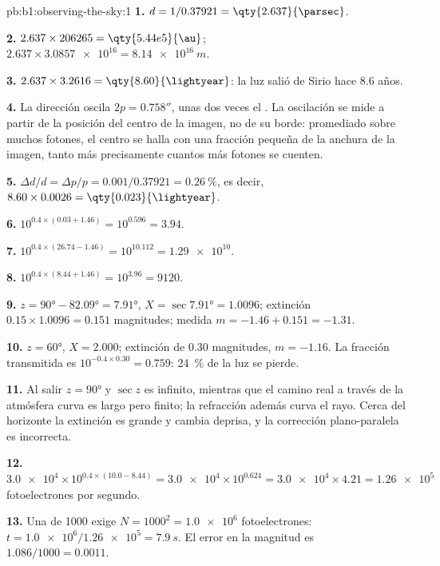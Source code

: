 \begin{solution}{pb:b1:observing-the-sky:1}
\textbf{1.} $d = 1/0.37921 = \qty{2.637}{\parsec}$.

\textbf{2.} $2.637\times206265 = \qty{5.44e5}{\au}$;
$2.637\times\num{3.0857e16} = \qty{8.14e16}{m}$.

\textbf{3.} $2.637\times3.2616 = \qty{8.60}{\lightyear}$: la luz salió de Sirio hace 8.6 años.

\textbf{4.} La dirección oscila $2p = \ang{;;0.758}$, unas dos veces el . La oscilación
se mide a partir de la posición del centro de la imagen, no de su borde: promediado sobre
muchos fotones, el centro se halla con una fracción pequeña de la anchura de la imagen, tanto
más precisamente cuantos más fotones se cuenten.

\textbf{5.} $\Delta d/d = \Delta p/p = 0.001/0.37921 = \qty{0.26}{\percent}$,
es decir, $8.60\times0.0026 = \qty{0.023}{\lightyear}$.

\textbf{6.} $10^{0.4\times(0.03 + 1.46)} = 10^{0.596} = 3.94$.

\textbf{7.} $10^{0.4\times(26.74 - 1.46)} = 10^{10.112} = \num{1.29e10}$.

\textbf{8.} $10^{0.4\times(8.44 + 1.46)} = 10^{3.96} = \num{9120}$.

\textbf{9.} $z = \ang{90} - \ang{82.09} = \ang{7.91}$, $X = \sec\ang{7.91} =
1.0096$; extinción $0.15\times1.0096 = 0.151$ magnitudes; medida
$m = -1.46 + 0.151 = -1.31$.

\textbf{10.} $z = \ang{60}$, $X = 2.000$; extinción de 0.30 magnitudes,
$m = -1.16$. La fracción transmitida es $10^{-0.4\times0.30} = 0.759$:
\qty{24}{\percent} de la luz se pierde.

\textbf{11.} Al salir $z = \ang{90}$ y $\sec z$ es infinito, mientras que el camino real
a través de la atmósfera curva es largo pero finito; la refracción además curva el rayo. Cerca
del horizonte la extinción es grande y cambia deprisa, y la corrección plano-paralela es
incorrecta.

\textbf{12.} $\num{3.0e4}\times10^{0.4\times(10.0 - 8.44)} = \num{3.0e4}
\times10^{0.624} = \num{3.0e4}\times4.21 = \num{1.26e5}$ fotoelectrones por segundo.

\textbf{13.} Una  de 1000 exige $N = 1000^2 = \num{1.0e6}$
fotoelectrones: $t = \num{1.0e6}/\num{1.26e5} = \qty{7.9}{s}$. El error en la magnitud es
$1.086/1000 = \num{0.0011}$.


\end{solution}
